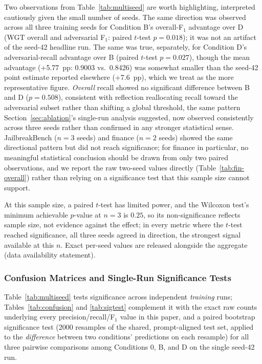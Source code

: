 \documentclass[superintelligence,article,accept,moreauthors]{Definitions/mdpi}
\begin{document}
Two observations from Table~\ref{tab:multiseed} are worth highlighting, interpreted cautiously given the small number of seeds. The same direction was observed across all three training seeds for Condition B's overall-F$_1$ advantage over D (WGT overall and adversarial F$_1$: paired $t$-test $p=0.018$); it was not an artifact of the seed-42 headline run. The same was true, separately, for Condition D's adversarial-recall advantage over B (paired $t$-test $p=0.027$), though the mean advantage (+5.77~pp: 0.9003 vs.\ 0.8426) was somewhat smaller than the seed-42 point estimate reported elsewhere (+7.6~pp), which we treat as the more representative figure. \emph{Overall} recall showed no significant difference between B and D ($p=0.508$), consistent with reflection reallocating recall toward the adversarial subset rather than shifting a global threshold, the same pattern Section~\ref{sec:ablation}'s single-run analysis suggested, now observed consistently across three seeds rather than confirmed in any stronger statistical sense. JailbreakBench ($n=3$ seeds) and finance ($n=2$ seeds) showed the same directional pattern but did not reach significance; for finance in particular, no meaningful statistical conclusion should be drawn from only two paired observations, and we report the raw two-seed values directly (Table~\ref{tab:fin-overall}) rather than relying on a significance test that this sample size cannot support.

At this sample size, a paired $t$-test has limited power, and the Wilcoxon test's minimum achievable $p$-value at $n=3$ is $0.25$, so its non-significance reflects sample size, not evidence against the effect; in every metric where the $t$-test reached significance, all three seeds agreed in direction, the strongest signal available at this $n$. Exact per-seed values are released alongside the aggregate (data availability statement).

\subsubsection{Confusion Matrices and Single-Run Significance Tests}
\label{sec:confusion}

Table~\ref{tab:multiseed} tests significance across independent \emph{training} runs; Tables~\ref{tab:confusion} and \ref{tab:sigtest} complement it with the exact raw counts underlying every precision/recall/F$_1$ value in this paper, and a paired bootstrap significance test (2000 resamples of the shared, prompt-aligned test set, applied to the \emph{difference} between two conditions' predictions on each resample) for all three pairwise comparisons among Conditions 0, B, and D on the single seed-42 run.
\end{document}
